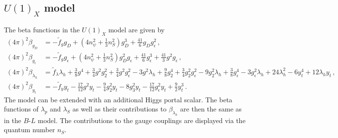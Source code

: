 \documentclass[aps,prd,twocolumn,preprintnumbers,superscriptaddress,nobibnotes,floatfix,longbibliography]{revtex4-1}
\begin{document}
\begin{widetext}
\subsection{\texorpdfstring{$U(1)_X$}{U(1)X} model}
The beta functions in the $U(1)_X$ model are given by
\begin{align}
(4 \pi)^2 \beta_{g_D} &= -\tilde f_g g_D+ (4 n_\psi^2 + \frac{1}{3}n_S^2) g_D^3+\frac{41}{6} g_D g_\epsilon ^2 \,,\\
(4 \pi)^2 \beta_{g_\epsilon } &=  -\tilde f_g g_\epsilon + (4 n_\psi^2 + \frac{1}{3}n_S^2)  g_D^2 g_\epsilon + \frac{41}{6} g_\epsilon ^3 + \frac{41}{3} g^2 g_\epsilon \,,\\
(4 \pi)^2 \beta_{\lambda_h} &=  \tilde f_\lambda \lambda_h+\frac{3}{8} g^4+\frac{3}{4} g^2 g_2^2+\frac{3}{4} g^2 g_\epsilon ^2-3 g^2 \lambda_h+\frac{9}{8} g_2^4 + \frac{3}{4} g_2^2 g_\epsilon ^2 -9 g_2^2 \lambda_h+\frac{3}{8} g_\epsilon ^4 - 3 g_\epsilon ^2 \lambda_h + 24 \lambda_h^2 - 6 y_t^4 +12 \lambda_h y_t \,,\\
(4 \pi)^2 \beta_{y_t} &=   -\tilde f_y y_t-\frac{17}{12} g^2 y_t  - \frac{9}{4} g_2^2 y_t - 8 g_3^2 y_t - \frac{17}{12} g_\epsilon ^2 y_t+\frac{9}{2} y_t^3 \,.
\end{align}
The model can be extended with an additional Higgs portal scalar.
The beta functions of $\lambda_p$ and $\lambda_S$ as well as their contributions to $\beta_{\lambda_h}$ are then the same as in the $B$-$L$ model.
The contributions to the gauge couplings are displayed via the quantum number $n_S$.
\end{widetext}

\footnotesize

\end{document}
